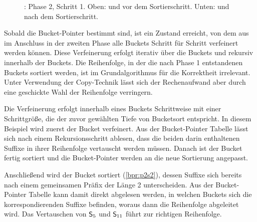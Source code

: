 \begin{figure}[H]
{\begin{minipage}{\textwidth}
        \hfill
    \end{minipage}}
    \caption[\bpr: Phase 2, Schritt 1]{\bpr: Phase 2, Schritt 1. Oben: \sa und \bptr vor dem Sortierschritt. Unten: \sa und \bptr nach dem Sortierschritt.}
    \label{bpr:p2s1}
\end{figure}
Sobald die Bucket-Pointer bestimmt sind, ist ein Zustand erreicht, von dem aus im Anschluss in der zweiten Phase alle Buckets Schritt für Schritt verfeinert werden können. Diese Verfeinerung erfolgt iterativ über die Buckets und rekursiv innerhalb der Buckets. Die Reihenfolge, in der die nach Phase 1 entstandenen Buckets sortiert werden, ist im Grundalgorithmus für die Korrektheit irrelevant. Unter Verwendung der Copy-Technik lässt sich der Rechenaufwand aber durch eine geschickte Wahl der Reihenfolge verringern.\par
Die Verfeinerung erfolgt innerhalb eines Buckets Schrittweise mit einer Schrittgröße, die der zuvor gewählten Tiefe von Bucketsort entspricht. In diesem Beispiel wird zuerst der Bucket  verfeinert. Aus der Bucket-Pointer Tabelle lässt sich nach einem Rekursionsschritt ablesen, dass die beiden darin enthaltenen Suffixe in ihrer Reihenfolge vertauscht werden müssen. Danach ist der Bucket fertig sortiert und die Bucket-Pointer werden an die neue Sortierung angepasst.\par
Anschließend wird der Bucket  sortiert (\cref{bpr:p2s2}), dessen Suffixe sich bereits nach einem gemeinsamen Präfix der Länge 2 unterscheiden. Aus der Bucket-Pointer Tabelle kann damit direkt abgelesen werden, in welchen Buckets sich die korrespondierenden Suffixe befinden, woraus dann die Reihenfolge abgeleitet wird. Das Vertauschen von \(\mathsf{S}_{5}\) und \(\mathsf{S}_{11}\) führt zur richtigen Reihenfolge.\par
